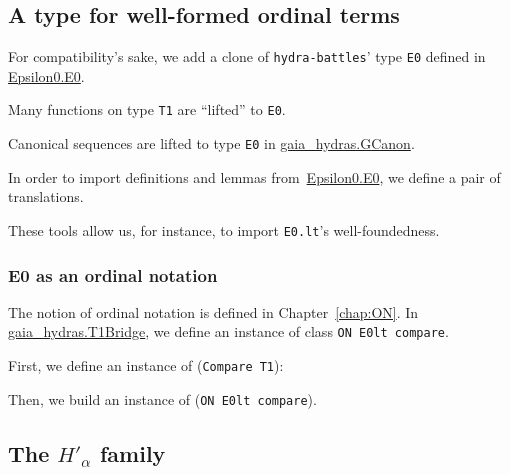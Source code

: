 \subsection{A type for well-formed ordinal terms}
\label{sect:E0-gaia-hydras}
For compatibility's sake, we add a clone of \texttt{hydra-battles}' type \texttt{E0} defined in \href{../theories/html/hydras.Epsilon0.E0.html}{Epsilon0.E0}.


Many functions on type \texttt{T1} are ``lifted'' to \texttt{E0}.



Canonical sequences are lifted to type \texttt{E0} in
\href{../theories/html/gaia_hydras.GCanon.html}{gaia\_hydras.GCanon}.



In order to import definitions and lemmas
from~\href{../theories/html/hydras.Epsilon0.E0.html}{Epsilon0.E0}, we define a pair of translations.


These tools allow us, for instance,  to import \texttt{E0.lt}'s  well-foundedness.



\subsubsection{E0 as an ordinal notation}

The notion of ordinal notation is defined in Chapter~\ref{chap:ON}. In \href{../theories/html/gaia_hydras.T1Bridge.html}{gaia\_hydras.T1Bridge}, we define an instance of class \texttt{ON E0lt compare}.

First, we define an instance of (\texttt{Compare T1}):


Then, we build an instance of (\texttt{ON E0lt compare}).





\subsection{The \texorpdfstring{$H'_\alpha$}{H'\_alpha} family}

